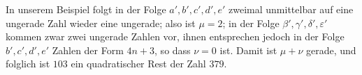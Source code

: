 In unserem Beispiel folgt in der Folge $a',b',c',d',e'$ zweimal unmittelbar auf eine ungerade Zahl wieder eine ungerade; also ist $\mu=2$; in der Folge $\beta',\gamma',\delta',\varepsilon'$ kommen zwar zwei ungerade Zahlen vor, ihnen entsprechen jedoch in der Folge $b',c',d',e'$ Zahlen der Form $4n+3$, so dass $\nu=0$ ist. Damit ist $\mu+\nu$ gerade, und folglich ist $103$ ein quadratischer Rest der Zahl $379$.

\BookRule{42mm}
